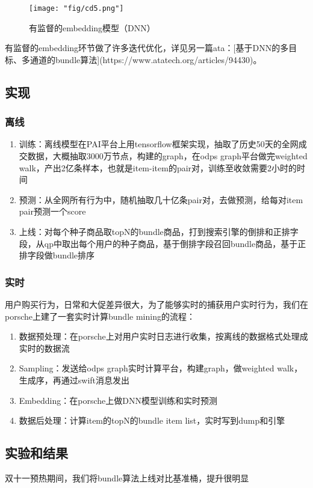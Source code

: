\begin{figure}[!h]
	\centering
	\texttt{[image: "fig/cd5.png"]}
	\caption{有监督的embedding模型（DNN）}
	\label{fig:cd5}
\end{figure}

有监督的embedding环节做了许多迭代优化，详见另一篇ata：[基于DNN的多目标、多通道的bundle算法](https://www.atatech.org/articles/94430)。


\subsection{实现}
\subsubsection{离线}
\begin{enumerate}
\item 训练：离线模型在PAI平台上用tensorflow框架实现，抽取了历史50天的全网成交数据，大概抽取3000万节点，构建的graph，在odps graph平台做完weighted walk，产出2亿条样本，也就是item-item的pair对，训练至收敛需要2小时的时间
\item 预测：从全网所有行为中，随机抽取几十亿条pair对，去做预测，给每对item pair预测一个score
\item 上线：对每个种子商品取topN的bundle商品，打到搜索引擎的倒排和正排字段，从qp中取出每个用户的种子商品，基于倒排字段召回bundle商品，基于正排字段做bundle排序
\end{enumerate}
\subsubsection{实时}
用户购买行为，日常和大促差异很大，为了能够实时的捕获用户实时行为，我们在porsche上建了一套实时计算bundle mining的流程：
\begin{enumerate}
\item 数据预处理：在porsche上对用户实时日志进行收集，按离线的数据格式处理成实时的数据流
\item Sampling：发送给odps graph实时计算平台，构建graph，做weighted walk，生成序，再通过swift消息发出
\item Embedding：在porsche上做DNN模型训练和实时预测
\item 数据后处理：计算item的topN的bundle item list，实时写到dump和引擎
\end{enumerate}


\subsection{实验和结果}
双十一预热期间，我们将bundle算法上线对比基准桶，提升很明显

